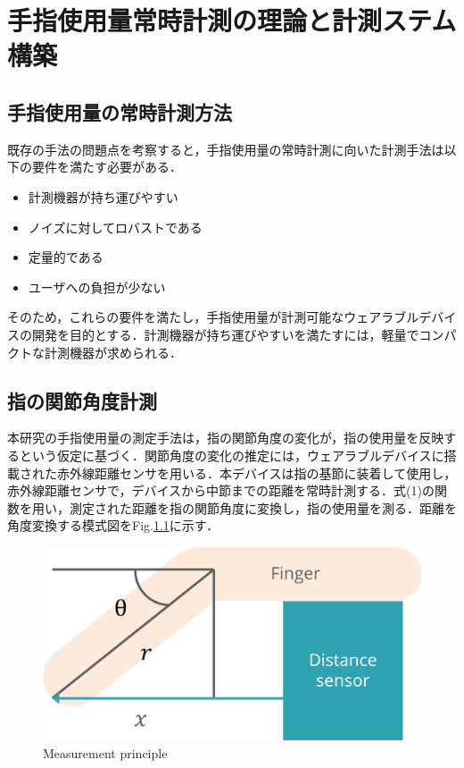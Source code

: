 \chapter{手指使用量常時計測の理論と計測ステム構築}

\section{手指使用量の常時計測方法}
既存の手法の問題点を考察すると，手指使用量の常時計測に向いた計測手法は以下の要件を満たす必要がある．

\begin{itemize}
 \item 計測機器が持ち運びやすい
 \item ノイズに対してロバストである
 \item 定量的である
 \item ユーザへの負担が少ない
\end{itemize}

そのため，これらの要件を満たし，手指使用量が計測可能なウェアラブルデバイスの開発を目的とする．計測機器が持ち運びやすいを満たすには，軽量でコンパクトな計測機器が求められる．



\section{指の関節角度計測}
本研究の手指使用量の測定手法は，指の関節角度の変化が，指の使用量を反映するという仮定に基づく．関節角度の変化の推定には，ウェアラブルデバイスに搭載された赤外線距離センサを用いる．本デバイスは指の基節に装着して使用し，赤外線距離センサで，デバイスから中節までの距離を常時計測する．式(1)の関数を用い，測定された距離を指の関節角度に変換し，指の使用量を測る．距離を角度変換する模式図をFig.\ref{fig:principle}に示す．

\begin{figure}[H]
  \centering
  \includegraphics[width=0.8\linewidth]{fig/principle}
  \caption{Measurement principle}
  \label{fig:principle}
\end{figure}

